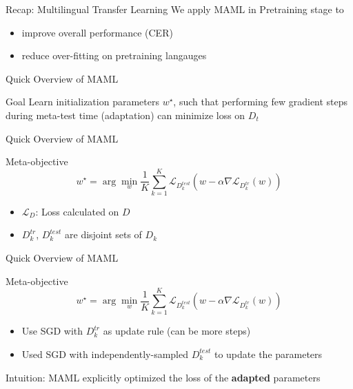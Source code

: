 \documentclass{beamer}
\begin{document}
\begin{frame}[t]{Recap: Multilingual Transfer Learning}
  We apply MAML in Pretraining stage to
  \begin{itemize}
    \item improve overall performance (CER)
    \item reduce over-fitting on pretraining langauges
  \end{itemize}
\end{frame}


\begin{frame}[t]{Quick Overview of MAML}
  \begin{block}{Goal}
    Learn initialization parameters $w^\star$, such that performing few gradient steps during meta-test time (adaptation) can minimize loss on $D_t$
  \end{block}

\end{frame}

\begin{frame}[t]{Quick Overview of MAML}
  \begin{block}{Meta-objective}
    \begin{equation*}
    w^\star = \arg \min_w \frac{1}{K}\sum_{k=1}^{K}\mathcal{L}_{D_k^{test}}(w - \alpha \nabla \mathcal{L}_{D_k^{tr}}(w))
    \end{equation*}
  \end{block}

  \begin{itemize}
    \item $\mathcal{L}_D$: Loss calculated on $D$
    \item $D_k^{tr}$, $D_k^{test}$ are disjoint sets of $D_k$
  \end{itemize}
\end{frame}

\begin{frame}[t]{Quick Overview of MAML}
  \begin{block}{Meta-objective}
    \begin{equation*}
    w^\star = \arg \min_w \frac{1}{K}\sum_{k=1}^{K}\mathcal{L}_{D_k^{test}}(w - \alpha \nabla \mathcal{L}_{D_k^{tr}}(w))
    \end{equation*}
  \end{block}

  \begin{itemize}
    \item Use SGD with $D_k^{tr}$ as update rule (can be more steps)
    \item Used SGD with independently-sampled $D_k^{test}$ to update the parameters
  \end{itemize}

  \vspace{1em}

  Intuition: MAML explicitly optimized the loss of the \textbf{adapted} parameters
\end{frame}
\end{document}
